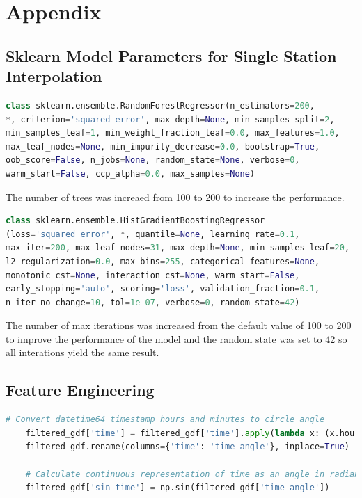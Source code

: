 \chapter{Appendix}


\section{Sklearn Model Parameters for Single Station Interpolation}
\label{appendix: sklearn ml parameters single station}

\begin{lstlisting}[language=Python, caption=Random Forest Regressor Parameters]
class sklearn.ensemble.RandomForestRegressor(n_estimators=200,
*, criterion='squared_error', max_depth=None, min_samples_split=2,
min_samples_leaf=1, min_weight_fraction_leaf=0.0, max_features=1.0,
max_leaf_nodes=None, min_impurity_decrease=0.0, bootstrap=True,
oob_score=False, n_jobs=None, random_state=None, verbose=0,
warm_start=False, ccp_alpha=0.0, max_samples=None)
\end{lstlisting}

The number of trees was increaed from 100 to 200 to increase the performance.

\begin{lstlisting}[language=Python, caption=Histogram-based Gradient Boosting Parameters]
class sklearn.ensemble.HistGradientBoostingRegressor
(loss='squared_error', *, quantile=None, learning_rate=0.1,
max_iter=200, max_leaf_nodes=31, max_depth=None, min_samples_leaf=20,
l2_regularization=0.0, max_bins=255, categorical_features=None,
monotonic_cst=None, interaction_cst=None, warm_start=False,
early_stopping='auto', scoring='loss', validation_fraction=0.1,
n_iter_no_change=10, tol=1e-07, verbose=0, random_state=42)
\end{lstlisting}

The number of max iterations was increased from the default value of 100 to 200 to improve the performance of the model and the random state was set to 42 so all interations yield the same result.

\section{Feature Engineering}

\begin{lstlisting}[language=Python, caption=Timestamp to Sinus Curve Feature, label=lst: timestamp to sin]
    # Convert datetime64 timestamp hours and minutes to circle angle
    filtered_gdf['time'] = filtered_gdf['time'].apply(lambda x: (x.hour * 60 + x.minute) * 2 * np.pi / (24 * 60))
    filtered_gdf.rename(columns={'time': 'time_angle'}, inplace=True)

    # Calculate continuous representation of time as an angle in radians
    filtered_gdf['sin_time'] = np.sin(filtered_gdf['time_angle'])
\end{lstlisting}

